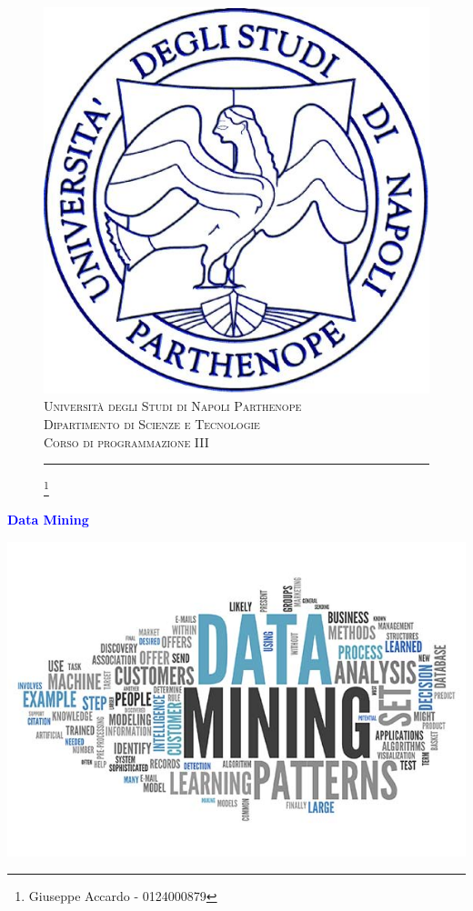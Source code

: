 \documentclass[a4paper, oneside]{book}
\begin{document}
\large
\begin{figure}
	\begin{center}
		\includegraphics[scale=0.30]{logo_parthenope.png} \\
		\textsc{Università degli Studi di Napoli Parthenope \\	
	        	Dipartimento di Scienze e Tecnologie \\
		        Corso di programmazione III}
            		   \rule{\textwidth}{0.9mm}
            		   \footnote{Giuseppe Accardo - 0124000879}
	\end{center}
\end{figure}

\begin{center}
\Huge{\bfseries\textcolor{blue}{{  Data Mining}}} \\
        \vspace{0.3cm}

        \includegraphics[scale=2.60]{FotoProgetto.jpg} \\
        \vspace{0.7cm}
\end{center}
\end{document}
